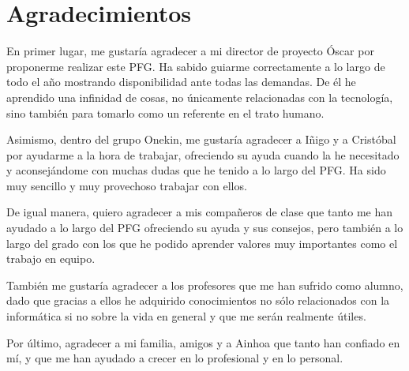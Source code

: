\chapter{Agradecimientos}

En primer lugar, me gustaría agradecer a mi director de proyecto Óscar por proponerme realizar este PFG. Ha sabido guiarme correctamente a lo largo de todo el año mostrando disponibilidad ante todas las demandas. De él he aprendido una infinidad de cosas, no únicamente relacionadas con la tecnología, sino también para tomarlo como un referente en el trato humano.

Asimismo, dentro del grupo Onekin, me gustaría agradecer a Iñigo y a Cristóbal por ayudarme a la hora de trabajar, ofreciendo su ayuda cuando la he necesitado y aconsejándome con muchas dudas que he tenido a lo largo del PFG. Ha sido muy sencillo y muy provechoso trabajar con ellos.

De igual manera, quiero agradecer a mis compañeros de clase que tanto me han ayudado a lo largo del PFG ofreciendo su ayuda y sus consejos, pero también a lo largo del grado con los que he podido aprender valores muy importantes como el trabajo en equipo.

También me gustaría agradecer a los profesores que me han sufrido como alumno, dado que gracias a ellos he adquirido conocimientos no sólo relacionados con la informática si no sobre la vida en general y que me serán realmente útiles.

Por último, agradecer a mi familia, amigos y a Ainhoa que tanto han confiado en mí, y que me han ayudado a crecer en lo profesional y en lo personal.